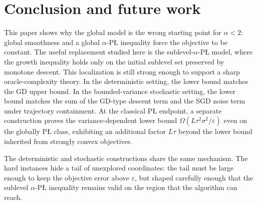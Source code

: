 \documentclass[11pt]{article}
\begin{document}
\section{Conclusion and future work}
\label{sec:conclusion}

This paper shows why the global model is the wrong starting point for \(\alpha<2\): global smoothness and a global
\(\alpha\)-P\L{} inequality force the objective to be constant. The useful replacement studied here is the
sublevel-\(\alpha\)-P\L{} model, where the growth inequality holds only on the initial sublevel set preserved by monotone
descent. This localization is still strong enough to support a sharp oracle-complexity theory. In the deterministic
setting, the lower bound matches the GD upper bound. In the bounded-variance stochastic setting, the lower
bound matches the sum of the GD-type descent term and the SGD noise term under trajectory containment. At the classical P\L{} endpoint, a separate construction proves the variance-dependent lower bound
$\Omega(L\tau^2\sigma^2/\varepsilon)$ even on the globally P\L{} class, exhibiting an additional factor $L\tau$
beyond the lower bound inherited from strongly convex objectives.

The deterministic and stochastic constructions share the same mechanism. The hard instances hide a tail of unexplored
coordinates: the tail must be large enough to keep the objective error above \(\varepsilon\), but shaped carefully enough
that the sublevel \(\alpha\)-P\L{} inequality remains valid on the region that the algorithm can reach.
\end{document}

